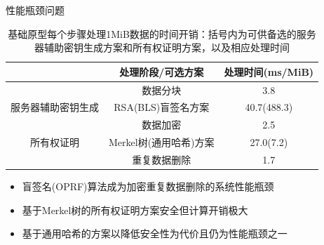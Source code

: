 \documentclass{beamer}
\begin{document}
\begin{frame}{性能瓶颈问题}
    \begin{table}[!htb]
        \small
        \centering
        \caption{基础原型每个步骤处理1MiB数据的时间开销：括号内为可供备选的服务器辅助密钥生成方案和所有权证明方案，以及相应处理时间}
        \label{tab:intro-bottleneck}
        \begin{tabular}{@{}ccc@{}}
            \toprule
                                        & 处理阶段/可选方案      & 处理时间(ms/MiB) \\ \midrule
                                        & 数据分块               & 3.8              \\
            服务器辅助密钥生成          & RSA(BLS)盲签名方案     & 40.7(488.3)      \\
            \multirow{3}{*}{所有权证明} & 数据加密               & 2.5              \\
                                        & Merkel树(通用哈希)方案 & 27.0(7.2)        \\
                                        & 重复数据删除           & 1.7              \\ \bottomrule
        \end{tabular}
    \end{table}
    \begin{itemize}
        \item 盲签名(OPRF)算法成为加密重复数据删除的系统性能瓶颈
        \item 基于Merkel树的所有权证明方案安全但计算开销极大
        \item 基于通用哈希的方案以降低安全性为代价且仍为性能瓶颈之一
    \end{itemize}
\end{frame}
\end{document}
